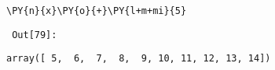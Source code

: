 {\par%
\vspace{-1\baselineskip}%
}%
\begin{notebookcell}[79]%
\begin{addmargin}[\cellleftmargin]{0em}%
{\smaller%
\par%
%
\vspace{-1\smallerfontscale}%
\begin{Verbatim}[commandchars=\\\{\}]
\PY{n}{x}\PY{o}{+}\PY{l+m+mi}{5}
\end{Verbatim}
%
\par%
\vspace{-1\smallerfontscale}}%
\end{addmargin}
\end{notebookcell}

\par\vspace{1\smallerfontscale}%
    
        {\par%
        \vspace{-1\smallerfontscale}%
        \noindent%
        \begin{minipage}{\cellleftmargin}%
    \hfill%
    {\smaller%
    \tt%
    \color{nbframe-out-prompt}%
    Out[79]:}%
    \hspace{\inputpadding}%
    \hspace{0em}%
    \hspace{3pt}%
    \end{minipage}%
        }%
    \begin{addmargin}[\cellleftmargin]{0em}%
    {\smaller%
    \vspace{-1\smallerfontscale}%
    
    
    
    \begin{verbatim}
array([ 5,  6,  7,  8,  9, 10, 11, 12, 13, 14])
    \end{verbatim}

    
}%
    \end{addmargin}%

